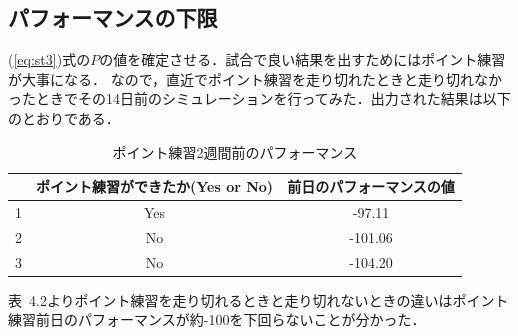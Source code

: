 \documentclass[12pt,fleqn]{jreport}
\begin{document}
\subsection{パフォーマンスの下限}
(\ref{eq:st3})式の$P$の値を確定させる．試合で良い結果を出すためにはポイント練習が大事になる．
なので，直近でポイント練習を走り切れたときと走り切れなかったときでその14日前のシミュレーションを行ってみた．出力された結果は以下のとおりである．
\begin{table}[H]
  \caption{ポイント練習2週間前のパフォーマンス}
  \begin{center}
    \begin{tabular}{|c|c|c|}
      \hline
        & ポイント練習ができたか(Yes or No) & 前日のパフォーマンスの値 \\
      \hline
      1 & Yes                               & -97.11                   \\
      \hline
      2 & No                                & -101.06                  \\
      \hline
      3 & No                                & -104.20                  \\
      \hline
    \end{tabular}
  \end{center}
\end{table}
表\ 4.2よりポイント練習を走り切れるときと走り切れないときの違いはポイント練習前日のパフォーマンスが約-100を下回らないことが分かった．
\end{document}
